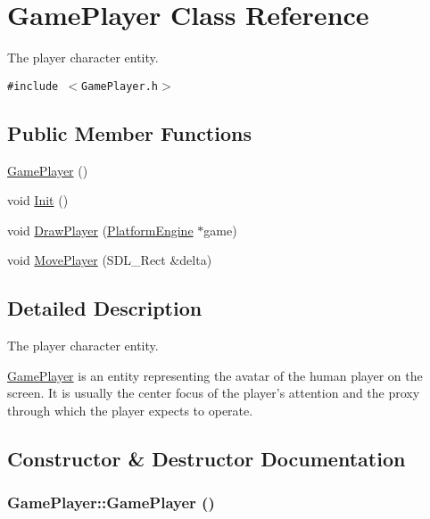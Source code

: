 \hypertarget{class_game_player}{
\section{GamePlayer Class Reference}
\label{d7/df6/class_game_player}
}
The player character entity.  


{\tt \#include $<$GamePlayer.h$>$}

\subsection*{Public Member Functions}
\begin{CompactItemize}
\item 
\hyperlink{class_game_player_f0314668e232831d2f9c263596dccde6}{GamePlayer} ()
\item 
void \hyperlink{class_game_player_61b39fe229f10d4f93d4eb96754a2961}{Init} ()
\item 
void \hyperlink{class_game_player_3394352e57e918eb17fec46498f5e348}{DrawPlayer} (\hyperlink{class_platform_engine}{PlatformEngine} $\ast$game)
\item 
void \hyperlink{class_game_player_46aa70e41a260b0ea8afdae38052d65c}{MovePlayer} (SDL\_\-Rect \&delta)
\end{CompactItemize}


\subsection{Detailed Description}
The player character entity. 

\hyperlink{class_game_player}{GamePlayer} is an entity representing the avatar of the human player on the screen. It is usually the center focus of the player's attention and the proxy through which the player expects to operate. 

\subsection{Constructor \& Destructor Documentation}
\hypertarget{class_game_player_f0314668e232831d2f9c263596dccde6}{
\subsubsection[{GamePlayer}]{\setlength{\rightskip}{0pt plus 5cm}GamePlayer::GamePlayer ()}}
\label{d7/df6/class_game_player_f0314668e232831d2f9c263596dccde6}




